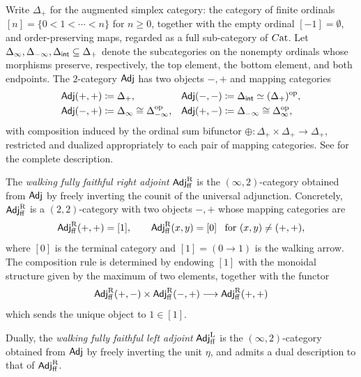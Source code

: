 \documentclass[a4paper,reqno,twoside]{amsart}
\begin{document}
\begin{definition}\label{def:AdjSS}
	Write $\Delta_+$ for the augmented simplex category: the category of finite ordinals $[n] = \{0 < 1 < \cdots < n\}$ for $n\geq 0$, together with the empty ordinal $[-1]=\emptyset$, and order-preserving maps, regarded as a full sub-category of $\relax{C}\mathrm{at}$. Let $\Delta_{\infty}, \Delta_{-\infty},\Delta_{\mathsf{int}} \subseteq \Delta_+$ denote the subcategories on the nonempty ordinals whose morphisms preserve, respectively, the top element, the bottom element, and both endpoints. The $2$-category $\mathsf{Adj}$ has two objects $-,+$ and mapping categories
	\[
		\begin{aligned}
			\mathsf{Adj}(+,+) &\coloneqq \Delta_+, & \mathsf{Adj}(-,-) &\coloneqq \Delta_{\mathsf{int}}\simeq (\Delta_+)^{\mathrm{op}}, \\
			\mathsf{Adj}(-,+) &\coloneqq \Delta_{\infty} \cong \Delta_{-\infty}^{\mathrm{op}}, & \mathsf{Adj}(+,-) &\coloneqq \Delta_{-\infty} \cong \Delta_{\infty}^{\mathrm{op}},
		\end{aligned}
	\]
	with composition induced by the ordinal sum bifunctor $\oplus \colon \Delta_+ \times \Delta_+ \to \Delta_+$, restricted and dualized appropriately to each pair of mapping categories. See \cite[Remark 3.3.8]{RiehlVerity2016FormalTheoryMonads} for the complete description.
\end{definition}



\begin{definition}\label{def:adjffr}
	The \emph{walking fully faithful right adjoint} $\mathsf{Adj}^{\operatorname{R}}_{\mathrm{ff}}$ is the $(\infty,2)$-category obtained from $\mathsf{Adj}$ by freely inverting the counit of the universal adjunction. Concretely, $\mathsf{Adj}^{\operatorname{R}}_{\mathrm{ff}}$ is a $(2,2)$-category with two objects $-,+$ whose mapping categories are
	\[
		\mathsf{Adj}^{\operatorname{R}}_{\mathrm{ff}}(+,+) = [1], \qquad \mathsf{Adj}^{\operatorname{R}}_{\mathrm{ff}}(x,y) = [0] \enspace \text{ for } (x,y) \neq (+,+),
	\]
	where $[0]$ is the terminal category and $[1] = (0 \to 1)$ is the walking arrow. The composition rule is determined by endowing $[1]$ with the monoidal structure given by the maximum of two elements, together with the functor
	\[
		\mathsf{Adj}^{\operatorname{R}}_{\mathrm{ff}}(+,-) \times \mathsf{Adj}^{\operatorname{R}}_{\mathrm{ff}}(-,+) \longrightarrow \mathsf{Adj}^{\operatorname{R}}_{\mathrm{ff}}(+,+)
	\]
	which sends the unique object to $1 \in [1]$.

	Dually, the \emph{walking fully faithful left adjoint} $\mathsf{Adj}^{\operatorname{L}}_{\mathrm{ff}}$ is the $(\infty,2)$-category obtained from $\mathsf{Adj}$ by freely inverting the unit $\eta$, and admits a dual description to that of $\mathsf{Adj}^{\operatorname{R}}_{\mathrm{ff}}$.
\end{definition}
\end{document}
